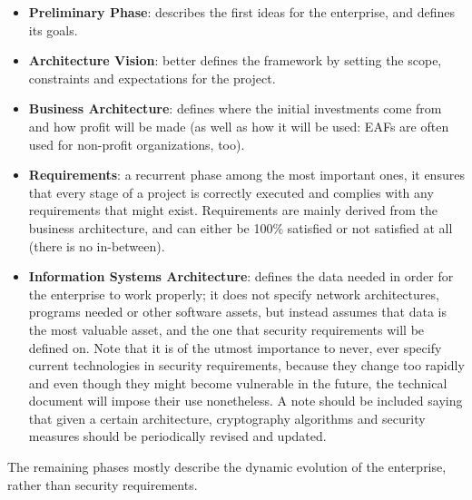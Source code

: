 \begin{itemize}
    \item \textbf{Preliminary Phase}: describes the first ideas for the enterprise, and defines its goals.
    \item \textbf{Architecture Vision}: better defines the framework by setting the scope, constraints and expectations for the project.
    \item \textbf{Business Architecture}: defines where the initial investments come from and how profit will be made (as well as how it will be used: EAFs are often used for non-profit organizations, too).
    \item \textbf{Requirements}: a recurrent phase among the most important ones, it ensures that every stage of a project is correctly executed and complies with any requirements that might exist. Requirements are mainly derived from the business architecture, and can either be 100\% satisfied or not satisfied at all (there is no in-between).
    \item \textbf{Information Systems Architecture}: defines the data needed in order for the enterprise to work properly; it does not specify network architectures, programs needed or other software assets, but instead assumes that data is the most valuable asset, and the one that security requirements will be defined on. Note that it is of the utmost importance to never, ever specify current technologies in security requirements, because they change too rapidly and even though they might become vulnerable in the future, the technical document will impose their use nonetheless. A note should be included saying that given a certain architecture, cryptography algorithms and security measures should be periodically revised and updated.
\end{itemize}

The remaining phases mostly describe the dynamic evolution of the enterprise, rather than security requirements.

